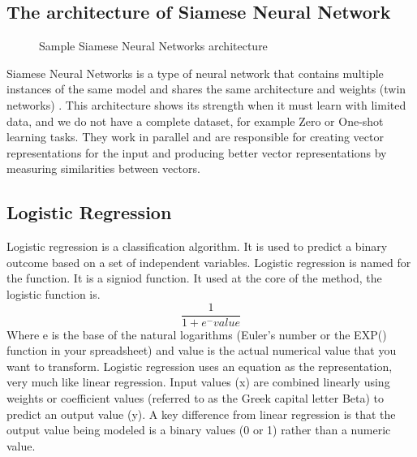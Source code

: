 \documentclass[12pt,oneside,openright,a4paper]{cpe-english-project}
\begin{document}
\subsection{The architecture of Siamese Neural Network}
\begin{figure}[!h]
  \centering
  \setlength{\fboxrule}{0.2mm}
  \setlength{\fboxsep}{0.5cm}
  \caption{Sample Siamese Neural Networks architecture}
  \label{fig:siamese_arch}
\end{figure}
Siamese Neural Networks is a type of neural network that contains multiple instances of the
same model and shares the same architecture and weights (twin networks) \cite{what_is_embedding_matrix, how_to_predict_questions_pair_using_malstm, introduction_siamese_network}
. This architecture shows its strength when it must learn with limited data, and we do not have a complete dataset,
for example Zero or One-shot learning tasks. They work in parallel and are responsible for creating vector
representations for the input and producing better vector representations by measuring similarities between vectors.

\subsection{Logistic Regression}
Logistic regression is a classification algorithm. It is used to predict a binary outcome based on a set of independent variables. Logistic regression is named for the function. It is a signiod function. It used at the core of the method, the logistic function is.
\[\frac{1}{1 + e^-value}\]
Where e is the base of the natural logarithms (Euler’s number or the EXP() function in your spreadsheet) and value is the actual numerical value that you want to transform.
Logistic regression uses an equation as the representation, very much like linear regression. Input values (x) are combined linearly using weights or coefficient values (referred to as the Greek capital letter Beta) to predict an output value (y). A key difference from linear regression is that the output value being modeled is a binary values (0 or 1) rather than a numeric value.
\end{document}
